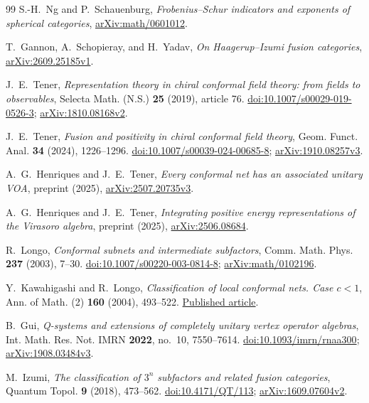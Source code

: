\begin{thebibliography}{99}
S.-H.~Ng and P.~Schauenburg,
\emph{Frobenius--Schur indicators and exponents of spherical categories},
\href{https://arxiv.org/abs/math/0601012}{arXiv:math/0601012}.

T.~Gannon, A.~Schopieray, and H.~Yadav,
\emph{On Haagerup--Izumi fusion categories},
\href{https://arxiv.org/abs/2609.25185v1}{arXiv:2609.25185v1}.

J.~E.~Tener,
\emph{Representation theory in chiral conformal field theory:
from fields to observables},
Selecta Math. (N.S.) \textbf{25} (2019), article 76.
\href{https://doi.org/10.1007/s00029-019-0526-3}{doi:10.1007/s00029-019-0526-3};
\href{https://arxiv.org/abs/1810.08168v2}{arXiv:1810.08168v2}.

J.~E.~Tener,
\emph{Fusion and positivity in chiral conformal field theory},
Geom. Funct. Anal. \textbf{34} (2024), 1226--1296.
\href{https://doi.org/10.1007/s00039-024-00685-8}{doi:10.1007/s00039-024-00685-8};
\href{https://arxiv.org/abs/1910.08257v3}{arXiv:1910.08257v3}.

A.~G.~Henriques and J.~E.~Tener,
\emph{Every conformal net has an associated unitary VOA},
preprint (2025),
\href{https://arxiv.org/abs/2507.20735v3}{arXiv:2507.20735v3}.

A.~G.~Henriques and J.~E.~Tener,
\emph{Integrating positive energy representations of the Virasoro algebra},
preprint (2025),
\href{https://arxiv.org/abs/2506.08684}{arXiv:2506.08684}.

R.~Longo,
\emph{Conformal subnets and intermediate subfactors},
Comm. Math. Phys. \textbf{237} (2003), 7--30.
\href{https://doi.org/10.1007/s00220-003-0814-8}{doi:10.1007/s00220-003-0814-8};
\href{https://arxiv.org/abs/math/0102196}{arXiv:math/0102196}.

Y.~Kawahigashi and R.~Longo,
\emph{Classification of local conformal nets. Case $c<1$},
Ann. of Math. (2) \textbf{160} (2004), 493--522.
\href{https://annals.math.princeton.edu/wp-content/uploads/annals-v160-n2-p04.pdf}{Published article}.

B.~Gui,
\emph{Q-systems and extensions of completely unitary vertex operator algebras},
Int. Math. Res. Not. IMRN \textbf{2022}, no.~10, 7550--7614.
\href{https://doi.org/10.1093/imrn/rnaa300}{doi:10.1093/imrn/rnaa300};
\href{https://arxiv.org/abs/1908.03484v3}{arXiv:1908.03484v3}.

M.~Izumi,
\emph{The classification of $3^n$ subfactors and related fusion categories},
Quantum Topol. \textbf{9} (2018), 473--562.
\href{https://doi.org/10.4171/QT/113}{doi:10.4171/QT/113};
\href{https://arxiv.org/abs/1609.07604v2}{arXiv:1609.07604v2}.


\end{thebibliography}
